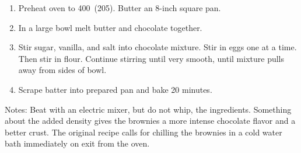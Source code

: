 
\begin{ingredients}
\end{ingredients}


\begin{recipe}
  \begin{enumerate}

  \item Preheat oven to 400\F\ (205\C).  Butter an 8-inch square pan.

  \item In a large bowl melt butter and chocolate together.

  \item Stir sugar, vanilla, and salt into chocolate mixture.  Stir in
    eggs one at a time.  Then stir in flour.  Continue stirring until
    very smooth, until mixture pulls away from sides of bowl.

  \item Scrape batter into prepared pan and bake 20 minutes.

  \end{enumerate}

  Notes: Beat with an electric mixer, but do not whip, the
  ingredients.  Something about the added density gives the brownies a
  more intense chocolate flavor and a better crust.  The original
  recipe calls for chilling the brownies in a cold water bath
  immediately on exit from the oven.
\end{recipe}
